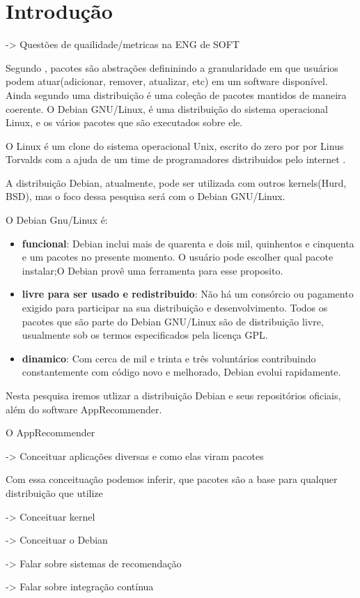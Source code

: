 \chapter*[Introdução]{Introdução}

-> Questões de quailidade/metricas na ENG de SOFT

Segundo \cite{Zacchiroli}, pacotes são abstrações defininindo a granularidade em que
usuários podem atuar(adicionar, remover, atualizar, etc) em um software disponível. Ainda
segundo \cite{Zacchiroli} uma distribuição é uma coleção de pacotes mantidos de maneira coerente.
O Debian GNU/Linux, é uma distribuição do sistema operacional Linux, e os vários pacotes que são executados sobre ele\cite{Debian}.

O Linux é um clone do sistema operacional Unix, escrito do zero por por Linus Torvalds com a ajuda de um time de programadores distribuidos pelo internet \cite{Linux}.

A distribuição Debian, atualmente, pode ser utilizada com outros kernels(Hurd, BSD), mas o foco dessa pesquisa será com o Debian GNU/Linux.

O Debian Gnu/Linux é:
        \begin{itemize}
        \item \textbf{funcional}: Debian inclui mais de quarenta e dois mil, quinhentos e cinquenta e um pacotes no presente momento. O usuário
        pode escolher qual pacote instalar;O Debian provê uma ferramenta para esse proposito.\cite{Debian}

        \item \textbf{livre para ser usado e redistribuido}: Não há um consórcio ou pagamento exigido para participar na sua distribuição e desenvolvimento.
        Todos os pacotes que são parte do Debian GNU/Linux são de distribuição livre, usualmente sob os termos especificados pela licença GPL.\cite{Debian}

        \item \textbf{dinamico}: Com cerca de mil e trinta e três voluntários contribuindo constantemente com código novo e melhorado, Debian evolui rapidamente.\cite{Debian}
        \end{itemize}

Nesta pesquisa iremos utlizar a distribuição Debian e seus repositórios oficiais, além do software AppRecommender.

O AppRecommender 



-> Conceituar aplicações diversas e como elas viram pacotes

Com essa conceituação podemos inferir, que pacotes são a base para qualquer distribuição que utilize


-> Conceituar kernel

-> Conceituar o Debian

-> Falar sobre sistemas de recomendação

-> Falar sobre integração contínua

